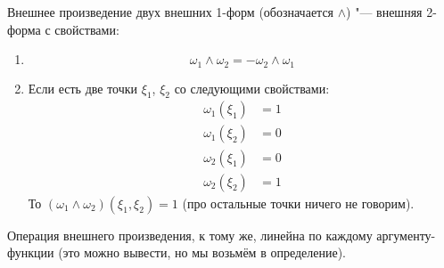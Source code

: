 \begin{Def}
	Внешнее произведение двух внешних 1-форм (обозначается $\wedge$) "--- внешняя 2-форма с свойствами:
	\begin{enumerate}
	\item
		\[ \omega_1 \wedge \omega_2 = - \omega_2 \wedge \omega_1 \]
	
	\item
		Если есть две точки $\xi_1$, $\xi_2$ со следующими свойствами:
		\begin{align*}
			\omega_1(\xi_1) &= 1 \\
			\omega_1(\xi_2) &= 0 \\
			\omega_2(\xi_1) &= 0 \\
			\omega_2(\xi_2) &= 1
		\end{align*}
		То $(\omega_1 \wedge \omega_2)(\xi_1, \xi_2) = 1$ (про остальные точки ничего не говорим).
	\end{enumerate}
	Операция внешнего произведения, к тому же, линейна по каждому аргументу-функции (это можно вывести, но мы возьмём в определение).
\end{Def}

